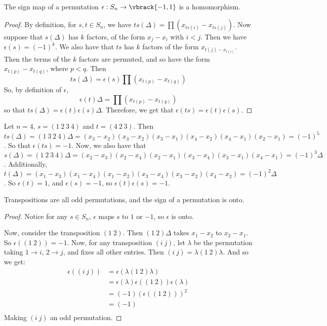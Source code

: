 \begin{lemma}\label{3.6.2}
    The sign map of a permutation $\epsilon:S_n \rightarrow \vbrack{-1,1}$ is a
    homomorphism.
\end{lemma}
\begin{proof}
    By definition, for $s,t \in S_n$, we have
    $ts(\Delta)=\prod{(x_{ts(i)}-x_{ts(j)})}$. Now suppose that $s(\Delta)$ has
    $k$ factors, of the form  $x_j-x_i$ with  $i<j$. Then we have
    $\epsilon(s)=(-1)^k$. We also have that $ts$ has  $k$ factors of the form
    $x_{t(j)-x_{t(i)}}$. Then the terms of the $k$ factors are permuted, and so
     have the form $x_{t(p)}-x_{t(q)}$, where $p<q$. Then
     \begin{equation*}
         ts(\Delta)=\epsilon(s)\prod{(x_{t(p)}-x_{t(q)})}
     \end{equation*}
     So, by definition of $\epsilon$,
     \begin{equation*}
         \epsilon(t)\Delta=\prod{(x_{t(p)}-x_{t(q)})}
     \end{equation*}
     so that $ts(\Delta)=\epsilon(t)\epsilon(s)\Delta$. Therefore, we get that
     $\epsilon(ts)=\epsilon(t)\epsilon(s)$.
\end{proof}

\begin{example}\label{}
    Let $n=4$, $s=(1 \ 2 \ 3 \ 4)$ and  $t=(4 \ 2 \ 3)$. Then $ts(\Delta)=(1 \ 3
    \ 2 \ 4)\Delta=(x_3-x_2)(x_3-x_2)(x_3-x_1)(x_4-x_2)(x_4-x_1)(x_2-x_1)=(-1)^5$.
    So that $\epsilon(ts)=-1$. Now, we also have that $s(\Delta)=(1 \ 2 \ 3 \
    4)\Delta=(x_2-x_3)(x_2-x_4)(x_2-x_1)(x_3-x_4)(x_3-x_1)(x_4-x_1)=(-1)^3\Delta$.
    Additionally,
    $t(\Delta)=(x_1-x_3)(x_1-x_4)(x_1-x_2)(x_3-x_4)(x_3-x_2)(x_4-x_2)=(-1)^2\Delta$.
    So $\epsilon(t)=1$, and $\epsilon(s)=-1$, so $\epsilon(t)\epsilon(s)=-1$.
\end{example}

\begin{theorem}\label{3.6.3}
    Transpositions are all odd permutations, and the sign of a permutation is
    onto.
\end{theorem}
\begin{proof}
    Notice for any $s \in S_n$,  $\epsilon$ maps  $s$ to  $1$ or  $-1$, so
    $\epsilon$ is onto.

    Now, consider the transposition  $(1 \ 2)$. Then $(1 \ 2)\Delta$ takes
    $x_1-x_2$ to $x_2-x_1$. So $\epsilon((1 \ 2))=-1$. Now, for any
    transposition $(i \ j)$, let $\lambda$ be the permutation taking  $1
    \rightarrow i$, $2 \rightarrow j$, and fixes all other entries. Then $(i \
    j)=\lambda(1 \ 2)\lambda$. And so we get:
    \begin{align*}
        \epsilon((i \ j))       &=      \epsilon(\lambda(1 \ 2)\lambda)     \\
                        &=      \epsilon(\lambda)\epsilon((1 \ 2))\epsilon(\lambda) \\
                        &= (-1)(\epsilon((1 \ 2)))^2        \\
                        &= (-1)                     \\
    \end{align*}
    Making $(i \ j)$ an odd permutation.
\end{proof}

